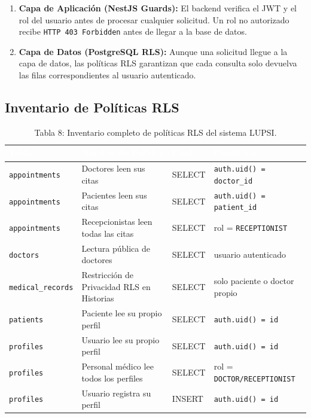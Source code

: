 \documentclass[a4paper,12pt]{article}
\renewcommand{\arraystretch}{1.1}
\begin{document}
\begin{enumerate}
  \item \textbf{Capa de Aplicación (NestJS Guards):} El backend verifica el JWT y el rol del usuario antes de procesar cualquier solicitud. Un rol no autorizado recibe \texttt{HTTP 403 Forbidden} antes de llegar a la base de datos.
  \item \textbf{Capa de Datos (PostgreSQL RLS):} Aunque una solicitud llegue a la capa de datos, las políticas RLS garantizan que cada consulta solo devuelva las filas correspondientes al usuario autenticado.
\end{enumerate}

\subsection{Inventario de Políticas RLS}

\begin{table}[H]
\centering\small\renewcommand{\arraystretch}{1.6}
\begin{tabular}{|p{3cm}|p{5.5cm}|p{1.5cm}|p{3.5cm}|}
\hline
\rowcolor{SKTPrimary}
\textcolor{white}{\textbf{Tabla}} & \textcolor{white}{\textbf{Nombre de Política}} & \textcolor{white}{\textbf{Cmd}} & \textcolor{white}{\textbf{Condición}} \\
\hline
\texttt{appointments} & Doctores leen sus citas & SELECT & \texttt{auth.uid() = doctor\_id} \\
\hline
\texttt{appointments} & Pacientes leen sus citas & SELECT & \texttt{auth.uid() = patient\_id} \\
\hline
\texttt{appointments} & Recepcionistas leen todas las citas & SELECT & rol = \texttt{RECEPTIONIST} \\
\hline
\texttt{doctors} & Lectura pública de doctores & SELECT & usuario autenticado \\
\hline
\texttt{medical\_records} & Restricción de Privacidad RLS en Historias & SELECT & solo paciente o doctor propio \\
\hline
\texttt{patients} & Paciente lee su propio perfil & SELECT & \texttt{auth.uid() = id} \\
\hline
\texttt{profiles} & Usuario lee su propio perfil & SELECT & \texttt{auth.uid() = id} \\
\hline
\texttt{profiles} & Personal médico lee todos los perfiles & SELECT & rol = \texttt{DOCTOR/RECEPTIONIST} \\
\hline
\texttt{profiles} & Usuario registra su perfil & INSERT & \texttt{auth.uid() = id} \\
\hline
\end{tabular}
\caption*{Tabla 8: Inventario completo de políticas RLS del sistema LUPSI.}
\end{table}
\end{document}
